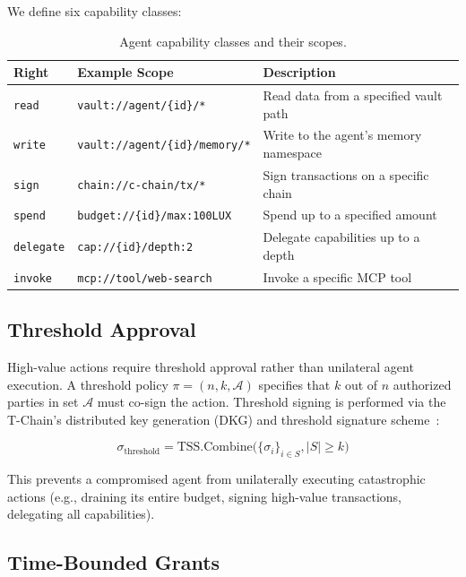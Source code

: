 \documentclass[11pt,a4paper]{article}
\begin{document}
We define six capability classes:

\begin{table}[H]
\centering
\caption{Agent capability classes and their scopes.}
\label{tab:capabilities}
\begin{tabular}{llp{6cm}}
\toprule
\textbf{Right} & \textbf{Example Scope} & \textbf{Description} \\
\midrule
\texttt{read} & \texttt{vault://agent/\{id\}/*} & Read data from a specified vault path \\
\texttt{write} & \texttt{vault://agent/\{id\}/memory/*} & Write to the agent's memory namespace \\
\texttt{sign} & \texttt{chain://c-chain/tx/*} & Sign transactions on a specific chain \\
\texttt{spend} & \texttt{budget://\{id\}/max:100LUX} & Spend up to a specified amount \\
\texttt{delegate} & \texttt{cap://\{id\}/depth:2} & Delegate capabilities up to a depth \\
\texttt{invoke} & \texttt{mcp://tool/web-search} & Invoke a specific MCP tool \\
\bottomrule
\end{tabular}
\end{table}

\subsection{Threshold Approval}

High-value actions require threshold approval rather than unilateral agent execution. A threshold policy $\pi = (n, k, \mathcal{A})$ specifies that $k$ out of $n$ authorized parties in set $\mathcal{A}$ must co-sign the action. Threshold signing is performed via the T-Chain's distributed key generation (DKG) and threshold signature scheme~\cite{gennaro2020threshold}:

\begin{equation}\label{eq:threshold}
    \sigma_{\text{threshold}} = \text{TSS.Combine}\big(\{\sigma_i\}_{i \in S}, |S| \geq k\big)
\end{equation}

This prevents a compromised agent from unilaterally executing catastrophic actions (e.g., draining its entire budget, signing high-value transactions, delegating all capabilities).

\subsection{Time-Bounded Grants}
\end{document}
